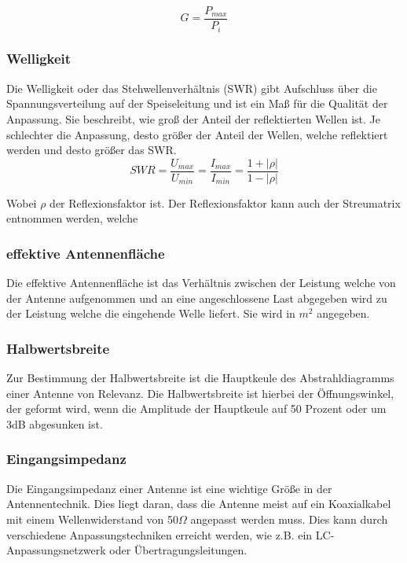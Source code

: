 \begin{equation}
	G=\frac{P_{max}}{P_{i}}
\end{equation}

\subsubsection{Welligkeit}
Die Welligkeit oder das Stehwellenverhältnis (SWR) gibt Aufschluss über die Spannungsverteilung auf der Speiseleitung und ist ein Maß für die Qualität der Anpassung. Sie beschreibt, wie groß der Anteil der reflektierten Wellen ist. Je schlechter die Anpassung, desto größer der Anteil der Wellen, welche reflektiert werden und desto größer das SWR.\\
\newline
\begin{equation}
	SWR=\frac{U_{max}}{U_{min}}=\frac{I_{max}}{I_{min}}=\frac{1+\lvert \rho \lvert}{1-\lvert \rho \lvert}
\end{equation}

Wobei $\rho$ der Reflexionsfaktor ist. Der Reflexionsfaktor kann auch der Streumatrix entnommen werden, welche


\subsubsection{effektive Antennenfläche}
Die effektive Antennenfläche ist das Verhältnis zwischen der Leistung welche von der Antenne aufgenommen und an eine angeschlossene Last abgegeben wird zu der Leistung welche die eingehende Welle liefert. Sie wird in $m^2$ angegeben.

\subsubsection{Halbwertsbreite}
Zur Bestimmung der Halbwertsbreite ist die Hauptkeule des Abstrahldiagramms einer Antenne von Relevanz. Die Halbwertsbreite ist hierbei der Öffnungswinkel, der geformt wird, wenn die Amplitude der Hauptkeule auf 50 Prozent oder um 3dB abgesunken ist.

\subsubsection{Eingangsimpedanz}
Die Eingangsimpedanz einer Antenne ist eine wichtige Größe in der Antennentechnik. Dies liegt daran, dass die Antenne meist auf ein Koaxialkabel mit einem Wellenwiderstand von 50$\Omega$ angepasst werden muss. Dies kann durch verschiedene Anpassungstechniken erreicht werden, wie z.B. ein LC-Anpassungsnetzwerk oder Übertragungsleitungen. 

